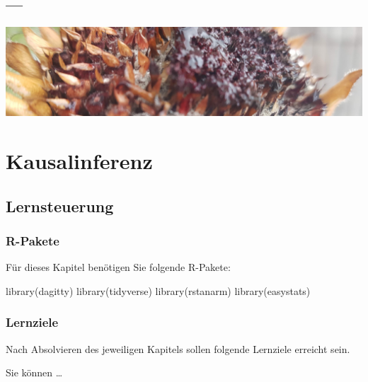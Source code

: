\documentclass[
  a4paper,
  DIV=11]{scrreprt}
\newenvironment{Shaded}{\begin{snugshade}}{\end{snugshade}}
\newcommand{\FunctionTok}[1]{\textcolor[rgb]{0.28,0.35,0.67}{#1}}
\newcommand{\NormalTok}[1]{\textcolor[rgb]{0.00,0.23,0.31}{#1}}
\theoremstyle{definition}
\theoremstyle{remark}
\begin{document}
\hypertarget{section-9}{%
\section{---}\label{section-9}}

\includegraphics[width=1\textwidth,height=\textheight]{./img/outro-10.jpg}


\hypertarget{kausalinferenz}{%
\chapter{Kausalinferenz}\label{kausalinferenz}}

\hypertarget{lernsteuerung-9}{%
\section{Lernsteuerung}\label{lernsteuerung-9}}

\hypertarget{r-pakete-1}{%
\subsection{R-Pakete}\label{r-pakete-1}}

Für dieses Kapitel benötigen Sie folgende R-Pakete:

\begin{Shaded}
\begin{Highlighting}[]
\FunctionTok{library}\NormalTok{(dagitty)}
\FunctionTok{library}\NormalTok{(tidyverse)}
\FunctionTok{library}\NormalTok{(rstanarm)}
\FunctionTok{library}\NormalTok{(easystats)}
\end{Highlighting}
\end{Shaded}

\hypertarget{lernziele-10}{%
\subsection{Lernziele}\label{lernziele-10}}

Nach Absolvieren des jeweiligen Kapitels sollen folgende Lernziele
erreicht sein.

Sie können \ldots{}
\end{document}
